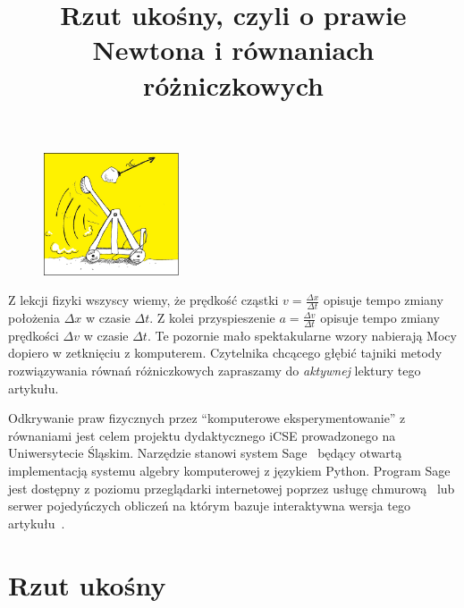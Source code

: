 \documentclass[10pt,twocolumn]{article}
\title{Rzut ukośny, czyli o prawie Newtona i równaniach różniczkowych}
\begin{document}
\maketitle
\begin{figure}
     \includegraphics[width=4cm]{3.jpg}
\end{figure}



Z lekcji fizyki wszyscy wiemy, że prędkość cząstki $v=\frac{\Delta
  x}{\Delta t}$ opisuje tempo zmiany położenia $\Delta x$ w czasie
$\Delta t$. Z kolei przyspieszenie $a=\frac{\Delta v}{\Delta t}$
opisuje tempo zmiany prędkości $\Delta v$ w czasie $\Delta t$. Te
pozornie mało spektakularne wzory nabierają Mocy dopiero w zetknięciu
z komputerem. Czytelnika chcącego głębić tajniki metody rozwiązywania
równań różniczkowych zapraszamy do {\it aktywnej} lektury tego
artykułu.


Odkrywanie praw fizycznych przez ``komputerowe eksperymentowanie'' z
równaniami jest celem projektu dydaktycznego iCSE prowadzonego na
Uniwersytecie Śląskim. Narzędzie stanowi system Sage\ \cite{sagemath}
będący otwartą implementacją systemu algebry komputerowej z językiem
Python. Program Sage jest dostępny z poziomu przeglądarki internetowej
poprzez usługę chmurową\ \cite{cloud} lub serwer pojedyńczych obliczeń  na
którym bazuje interaktywna wersja tego artykułu\ \cite{web}.
%
 


\section{Rzut ukośny}
\end{document}
